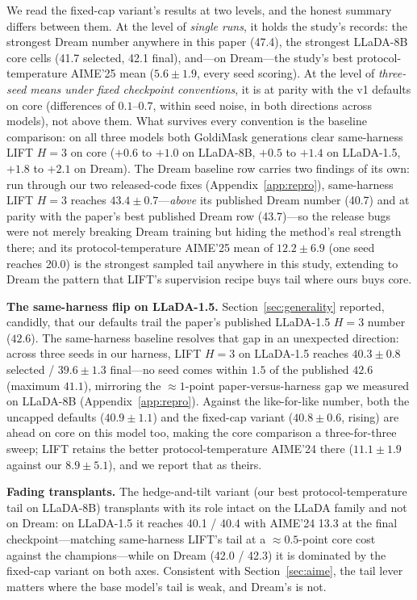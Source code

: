 \documentclass{article} %
\begin{document}
We read the fixed-cap variant's results at two levels, and the honest summary differs between them. At the level of \emph{single runs}, it holds the study's records: the strongest Dream number anywhere in this paper (47.4), the strongest LLaDA-8B core cells (41.7 selected, 42.1 final), and---on Dream---the study's best protocol-temperature AIME'25 mean ($5.6 \pm 1.9$, every seed scoring). At the level of \emph{three-seed means under fixed checkpoint conventions}, it is at parity with the v1 defaults on core (differences of $0.1$--$0.7$, within seed noise, in both directions across models), not above them. What survives every convention is the baseline comparison: on all three models both GoldiMask generations clear same-harness LIFT $H{=}3$ on core ($+0.6$ to $+1.0$ on LLaDA-8B, $+0.5$ to $+1.4$ on LLaDA-1.5, $+1.8$ to $+2.1$ on Dream). The Dream baseline row carries two findings of its own: run through our two released-code fixes (Appendix~\ref{app:repro}), same-harness LIFT $H{=}3$ reaches $43.4 \pm 0.7$---\emph{above} its published Dream number (40.7) and at parity with the paper's best published Dream row (43.7)---so the release bugs were not merely breaking Dream training but hiding the method's real strength there; and its protocol-temperature AIME'25 mean of $12.2 \pm 6.9$ (one seed reaches 20.0) is the strongest sampled tail anywhere in this study, extending to Dream the pattern that LIFT's supervision recipe buys tail where ours buys core.

\textbf{The same-harness flip on LLaDA-1.5.} Section~\ref{sec:generality} reported, candidly, that our defaults trail the paper's published LLaDA-1.5 $H{=}3$ number ($42.6$). The same-harness baseline resolves that gap in an unexpected direction: across three seeds in our harness, LIFT $H{=}3$ on LLaDA-1.5 reaches $40.3 \pm 0.8$ selected / $39.6 \pm 1.3$ final---no seed comes within $1.5$ of the published $42.6$ (maximum $41.1$), mirroring the $\approx 1$-point paper-versus-harness gap we measured on LLaDA-8B (Appendix~\ref{app:repro}). Against the like-for-like number, both the uncapped defaults ($40.9 \pm 1.1$) and the fixed-cap variant ($40.8 \pm 0.6$, rising) are ahead on core on this model too, making the core comparison a three-for-three sweep; LIFT retains the better protocol-temperature AIME'24 there ($11.1 \pm 1.9$ against our $8.9 \pm 5.1$), and we report that as theirs.

\textbf{Fading transplants.} The hedge-and-tilt variant (our best protocol-temperature tail on LLaDA-8B) transplants with its role intact on the LLaDA family and not on Dream: on LLaDA-1.5 it reaches 40.1 / 40.4 with AIME'24 13.3 at the final checkpoint---matching same-harness LIFT's tail at a $\approx 0.5$-point core cost against the champions---while on Dream (42.0 / 42.3) it is dominated by the fixed-cap variant on both axes. Consistent with Section~\ref{sec:aime}, the tail lever matters where the base model's tail is weak, and Dream's is not.
\end{document}
